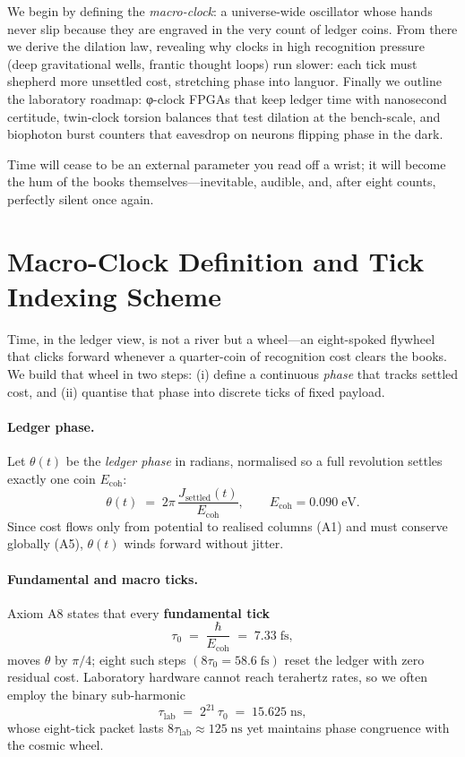 \documentclass[11pt,oneside]{book}
\begin{document}
We begin by defining the \emph{macro-clock}: a universe-wide oscillator whose hands never slip because they are engraved in the very count of ledger coins.  
From there we derive the dilation law, revealing why clocks in high recognition pressure (deep gravitational wells, frantic thought loops) run slower: each tick must shepherd more unsettled cost, stretching phase into languor.  
Finally we outline the laboratory roadmap: φ-clock FPGAs that keep ledger time with nanosecond certitude, twin-clock torsion balances that test dilation at the bench-scale, and biophoton burst counters that eavesdrop on neurons flipping phase in the dark.

Time will cease to be an external parameter you read off a wrist; it will become the hum of the books themselves—inevitable, audible, and, after eight counts, perfectly silent once again.

\section{Macro-Clock Definition and Tick Indexing Scheme}
\label{sec:macro-clock}

Time, in the ledger view, is not a river but a wheel—an eight-spoked
flywheel that clicks forward whenever a quarter-coin of recognition cost
clears the books.  
We build that wheel in two steps: (i) define a continuous \emph{phase}
that tracks settled cost, and (ii) quantise that phase into discrete
ticks of fixed payload.

\paragraph*{Ledger phase.}
Let \(\theta(t)\) be the \emph{ledger phase} in radians, normalised so a
full revolution settles exactly one coin \(E_{\text{coh}}\):
\[
  \theta(t)
  \;=\;
  2\pi\,\frac{J_{\mathrm{settled}}(t)}{E_{\text{coh}}},
\qquad
  E_{\text{coh}} = 0.090\;\text{eV}.
\]
Since cost flows only from potential to realised columns (A1) and must
conserve globally (A5), \(\theta(t)\) winds forward without jitter.

\paragraph*{Fundamental and macro ticks.}
Axiom A8 states that every \textbf{fundamental tick}
\[
   \tau_{0}
      \;=\;
      \frac{\hbar}{E_{\text{coh}}}
      \;=\;
      7.33\;\text{fs},
\]
moves \(\theta\) by \(\pi/4\); eight such steps \((8\tau_0 = 58.6\;\text{fs})\)
reset the ledger with zero residual cost.  
Laboratory hardware cannot reach terahertz rates, so we often employ the
binary sub-harmonic
\[
  \tau_{\text{lab}}
     \;=\;
     2^{21}\,\tau_{0}
     \;=\;
     15.625\;\text{ns},
\]
whose eight-tick packet lasts \(8\tau_{\text{lab}}\approx125\;\text{ns}\)
yet maintains phase congruence with the cosmic wheel.
\end{document}

